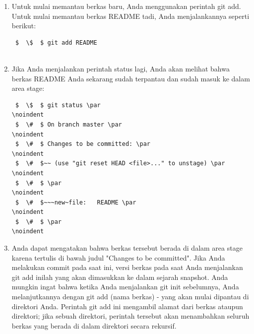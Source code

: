   \begin{enumerate}


\item Untuk mulai memantau berkas baru, Anda menggunakan perintah git add. Untuk mulai memantau berkas README tadi, Anda menjalankannya seperti berikut: \par
\vspace{12pt}
\noindent 
\begin{verbatim}
 $  \$  $ git add README
 
 \end{verbatim}
  \par
\vspace{12pt}
\noindent 

\item Jika Anda menjalankan perintah status lagi, Anda akan melihat bahwa berkas README Anda sekarang sudah terpantau dan sudah masuk ke dalam area stage: \par
\vspace{12pt}
\noindent 

\begin{verbatim}
 $  \$  $ git status \par
\noindent 
 $  \#  $ On branch master \par
\noindent 
 $  \#  $ Changes to be committed: \par
\noindent 
 $  \#  $~~ (use "git reset HEAD <file>..." to unstage) \par
\noindent 
 $  \#  $ \par
\noindent 
 $  \#  $~~~new~file:   README \par
\noindent 
 $  \#  $ \par
\noindent 

 \end{verbatim}

\item Anda dapat mengatakan bahwa berkas tersebut berada di dalam area stage karena tertulis di bawah judul "Changes to be committed". Jika Anda melakukan commit pada saat ini, versi berkas pada saat Anda menjalankan git add inilah yang akan dimasukkan ke dalam sejarah snapshot. Anda mungkin ingat bahwa ketika Anda menjalankan git init sebelumnya, Anda melanjutkannya dengan git add (nama berkas) - yang akan mulai dipantau di direktori Anda. Perintah git add ini mengambil alamat dari berkas ataupun direktori; jika sebuah direktori, perintah tersebut akan menambahkan seluruh berkas yang berada di dalam direktori secara rekursif. \par
\vspace{12pt}
\noindent 


\end{enumerate}
